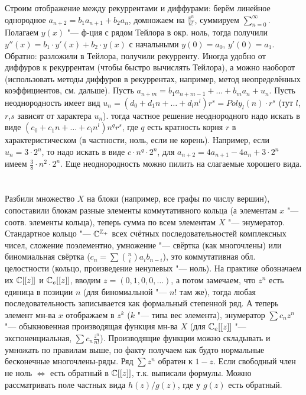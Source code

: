Строим отображение между рекуррентами и диффурами: берём линейное однородное $a_{n+2}=b_1a_{n+1}+b_2a_n$,
домножаем на $\frac{x^n}{n!}$, суммируем $\sum_{n=0}^\infty$.
Полагаем $y(x)$ "--- ф-ция с рядом Тейлора в окр. ноль, тогда получили $y''(x)=b_1\cdot y'(x) + b_2 \cdot y(x)$
с начальными $y(0)=a_0$, $y'(0)=a_1$.
Обратно: разложили в Тейлора, получили рекурренту.
Иногда удобно от диффуров к рекуррентам (чтобы быстро вычислять Тейлора), а можно наоборот (использовать методы диффуров в рекуррентах,
например, метод неопределённых коэффициентов, см. дальше).
Пусть $a_{n+m}=b_1a_{n+m-1}+\dots+b_ma_n+u_n$.
Пусть неоднородность имеет вид $u_n=(d_0+d_1n+\dots+d_ln^l)r^s=Poly_l(n) \cdot r^s$ (тут $l$,$r$,$s$ зависят от характера $u_n$).
тогда частное решение неоднородного надо искать в виде $(c_0+c_1n+\dots+c_ln^l)n^qr^s$, где $q$ есть кратность корня $r$ в характеристическом
(в частности, ноль, если не корень).
Например, если $u_n=3\cdot2^n$, то надо искать в виде $c\cdot n^q \cdot 2^n$, для $a_{n+2}=4a_{n+1}-4a_n+3\cdot 2^n$ имеем
$\frac{3}{8} \cdot n^2 \cdot 2^n$.
Еще неоднородность можно пилить на слагаемые хорошего вида.

\section{} %
Разбили множество $X$ на блоки (например, все графы по числу вершин), сопоставили блокам разные элементы
коммутативного кольца (а элементам $x$ "--- соотв. элементы кольца), теперь сумма по всем элементам $X$ "--- энумератор.
Стандартное кольцо "--- $\mathbb{C}^{\mathbb{Z}_+}$ всех счётных последовательностей комплексных чисел, сложение поэлементно,
умножение "--- свёртка (как многочлены) или биномиальная свёртка ($c_n=\sum \binom{n}{i}a_ib_{n-i}$), это коммутативная
обл. целостности (кольцо, произведение ненулевых "--- ноль).
На практике обозначаем их $\mathbb{C}[[z]]$ и $\mathbb{C}_e[[z]]$, вводим $z=(0,1,0,0,\dots)$, а потом замечаем, что $z^n$ есть единица в позиции $n$
(для биномиальной "--- $n!$ там же), тогда любая последовательность записывается как формальный степенной ряд.
А теперь элемент мн-ва $x$ отображаем в $z^k$ ($k$ "--- типа вес элемента), энумератор $\sum c_nz^n$ "--- обыкновенная производящая функция
мн-ва $X$ (для $\mathbb{C}_e[[z]]$ "--- экспоненциальная, $\sum c_n\frac{z^n}{n!}$).
Производящие функции можно складывать и умножать по правилам выше, по факту получаем как будто нормальные бесконечные многочлены-ряды.
Ряд $\sum z^n$ обратен к $1-z$.
Если свободный член не ноль $\iff$ есть обратный в $\mathbb{C}[[z]]$, т.к. выписали формулы.
Можно рассматривать поле частных вида $h(z)/g(z)$, где у $g(z)$ есть обратный.

